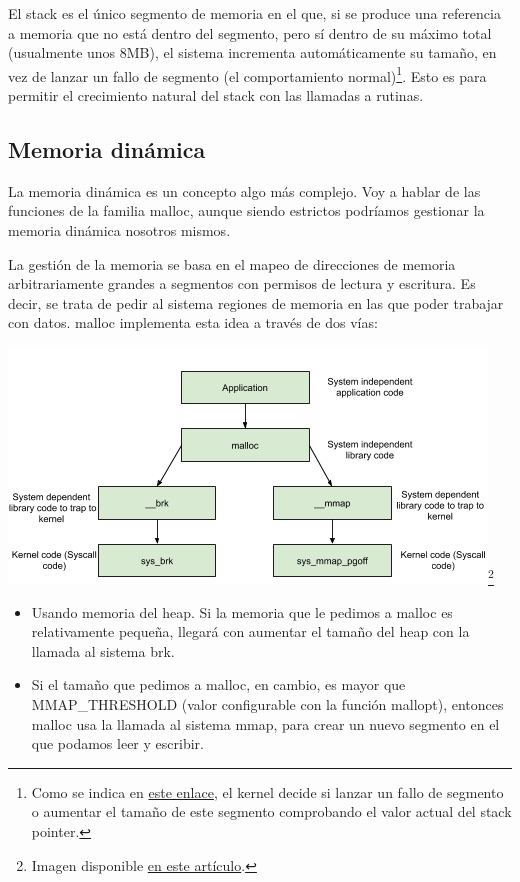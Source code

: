 \documentclass[a4paper]{article}
\begin{document}
El stack es el único segmento de memoria en el que, si se produce una referencia a memoria que no está dentro del segmento, pero sí dentro de su máximo total (usualmente unos 8MB), el sistema incrementa automáticamente su tamaño, en vez de lanzar un fallo de segmento (el comportamiento normal)\footnote{Como se indica en \href{https://stackoverflow.com/questions/54564273/dynamic-expansion-of-the-linux-stack}{este enlace}, el kernel decide si lanzar un fallo de segmento o aumentar el tamaño de este segmento comprobando el valor actual del stack pointer.}. Esto es para permitir el crecimiento natural del {\ttfamily stack} con las llamadas a rutinas.

\subsection{Memoria dinámica}

La memoria dinámica es un concepto algo más complejo. Voy a hablar de las funciones de la familia {\ttfamily malloc}, aunque siendo estrictos podríamos gestionar la memoria dinámica nosotros mismos.

La gestión de la memoria se basa en el mapeo de direcciones de memoria arbitrariamente grandes a segmentos con permisos de lectura y escritura. Es decir, se trata de pedir al sistema regiones de memoria en las que poder trabajar con datos. {\ttfamily malloc} implementa esta idea a través de dos vías:

\begin{center}
    \includegraphics[scale=0.7]{malloc.png}\footnote{Imagen disponible \href{https://sploitfun.wordpress.com/2015/02/11/syscalls-used-by-malloc/}{en este artículo}.}
\end{center}


\begin{itemize}
    \item Usando memoria del {\ttfamily heap}. Si la memoria que le pedimos a {\ttfamily malloc} es relativamente pequeña, llegará con aumentar el tamaño del {\ttfamily heap} con la llamada al sistema {\ttfamily brk}.
    \item Si el tamaño que pedimos a {\ttfamily malloc}, en cambio, es mayor que {\ttfamily MMAP\_THRESHOLD} (valor configurable con la función {\ttfamily mallopt}), entonces {\ttfamily malloc} usa la llamada al sistema {\ttfamily mmap}, para crear un nuevo segmento en el que podamos leer y escribir.
\end{itemize}
\end{document}
